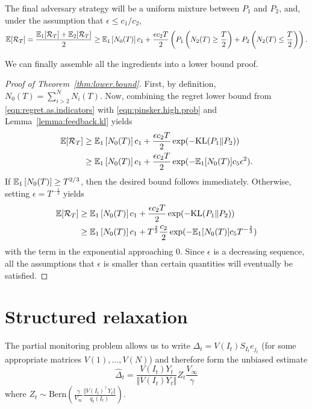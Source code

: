 \documentclass{article}
\newcommand{\KL}{\mathrm{KL}}
\newcommand{\regret}{\mathcal{R}}
\begin{document}
The final adversary strategy will be a uniform mixture between $P_1$ and $P_2$, and, under the assumption that $\epsilon\leq c_1/c_2$,
\begin{equation}
  \label{eqn:regret.as.indicators}
    \ex[\regret_T]
  =
    \frac{\ex_1[\regret_T] + \ex_2[\regret_T]}{2}
  \geq
    \ex_1\left[N_0(T)\right]c_1
    + \frac{\epsilon c_2 T}{2}
    \left(
    P_1\left(N_2(T)\geq \frac{T}{2}\right)
    +    
    P_2\left(N_2(T)\leq\frac{T}{2}\right)
    \right).
  \end{equation}
  
We can finally assemble all the ingredients into a lower bound proof.
\begin{proof}[Proof of Theorem~\ref{thm:lower.bound}]
  First, by definition, $N_0(T) = \sum_{i>2}^N N_i(T)$. Now, combining the regret lower bound from \eqref{eqn:regret.as.indicators} with \eqref{eqn:pinsker.high.prob} and Lemma~\ref{lemma:feedback.kl} yields
\begin{align*}   
  \ex[\regret_T]
&\geq
    \ex_1\left[N_0(T)\right]c_1
    + \frac{\epsilon c_2 T}{2}
  \exp(-\KL(P_1\Vert P_2) )\\
&\geq
      \ex_1\left[N_0(T)\right]c_1
    + \frac{\epsilon c_2 T}{2}
    \exp(- \ex_1[N_0(T)] c_5 \epsilon^2 ).
\end{align*}
If $\mathbb E_1\left[N_0(T)\right] \geq T^{2/3}$, then the desired bound follows immediately. Otherwise, setting $\epsilon = T^{-\frac13}$ yields 
\begin{align*}   
  \ex[\regret_T]
&\geq
    \ex_1\left[N_0(T)\right]c_1
    + \frac{\epsilon c_2 T}{2}
  \exp(-\KL(P_1\Vert P_2) )\\
&\geq
      \ex_1\left[N_0(T)\right]c_1
    +  T^{\frac23}\frac{c_2}{2}
    \exp(- \ex_1[N_0(T)] c_5 T^{-\frac23} )
\end{align*}
with the term in the exponential approaching 0. Since $\epsilon$ is a decreasing sequence, all the assumptions that $\epsilon$ is smaller than certain quantities will eventually be satisfied.
\end{proof}

\section{Structured relaxation}
The partial monitoring problem allows us to write $\Delta_t = V(I_t) S_{I_t} e_{j_t}$ (for some appropriate matrices $V(1),\ldots, V(N)$) and therefore form the unbiased estimate 
\[
  \hat\Delta_t = \frac{V(I_t) Y_t}{\Vert V(I_t) Y_t\Vert}  Z_t \frac{ V_\infty}{\gamma}
\]
where $Z_t \sim\text{Bern}\left(\frac{\gamma}{V_\infty} \frac{\Vert V(I_t)^\top Y_t \Vert}{q_t(I_t)}\right)$.
\end{document}
